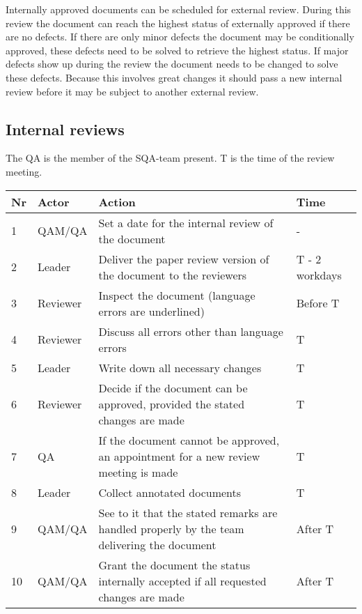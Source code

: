 \documentclass[%
		pathtobase=..,%
		titlefull={Software Validation and Verification Plan},%
		titleabbr=SVVP,%
		version=0.1]{fingerpaint}
\begin{document}
Internally approved documents can be scheduled for external review. During this review the document can reach the highest status of externally approved if there are no defects. If there are only minor defects the document may be conditionally approved, these defects need to be solved to retrieve the highest status. If major defects show up during the review the document needs to be changed to solve these defects. Because this involves great changes it should pass a new internal review before it may be subject to another external review.

\subsection{Internal reviews} \label{internal review details}
The QA is the member of the SQA-team present. T is the time of the review meeting.


\begin{tabular}{|l|l|p{20em}|l|}
\hline
 Nr &Actor     &  Action                                                 & Time \\
\hline
 1  & QAM/QA   & Set a date for the internal review of the document      &    -\\
 2  & Leader   &  Deliver the paper review version of the document to the reviewers   & T - 2 workdays\\
                
 3  & Reviewer &  Inspect the document (language errors are underlined)  & Before T\\
 4  & Reviewer &  Discuss all errors other than language errors          & T\\
 5  & Leader   &  Write down all necessary changes                       & T\\
 6  & Reviewer &  Decide if the document can be approved, provided the stated changes are made  & T\\
                
 7  & QA       &  If the document cannot be approved, an appointment for a new review meeting is made    & T\\
                
 8  & Leader   &  Collect annotated documents                            & T\\
 9  & QAM/QA   & See to it that the stated remarks are handled properly by the team delivering the document  &   After T\\
                
 10 & QAM/QA   & Grant the document the status internally accepted if all requested changes are made     &   After T\\
                
\hline
\end{tabular}
\end{document}

